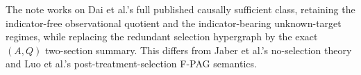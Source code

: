 The note works on Dai et al.'s full published causally sufficient class, retaining the indicator-free observational quotient and the indicator-bearing unknown-target regimes, while replacing the redundant selection hypergraph by the exact \((A,Q)\) two-section summary.  This differs from Jaber et al.'s no-selection theory and Luo et al.'s post-treatment-selection F-PAG semantics.